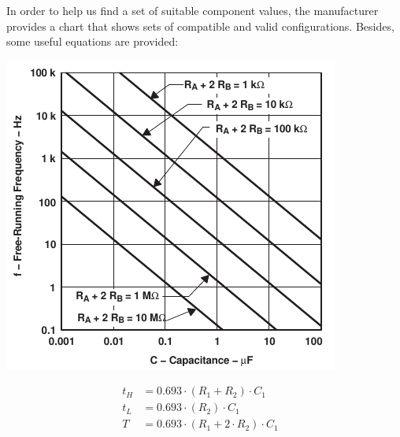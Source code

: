 \documentclass[a4paper, 11pt, oneside]{article}
\begin{document}
\vspace{0.25cm}

In order to help us find a set of suitable component values, the manufacturer provides a chart that shows sets of compatible and valid configurations. Besides, some useful equations are provided:

\vspace{0.6cm}

\begin{minipage}{\textwidth}
    \begin{minipage}[c]{0.49\textwidth}
        \centering
        \includegraphics[scale=1]{Graphics/Practice 2/GRAPHICS/555/GRAPHS/DATASHEETS/ASTABLE_FREQ.pdf}
        \label{fig:ASTABLE_FREQ}
    \end{minipage}
    \hfill
    \begin{minipage}[c]{0.49\textwidth}
        \centering
            \begin{align*}
                t_H &= 0.693 \cdot (R_1 + R_2) \cdot C_1& \\
                t_L &= 0.693 \cdot (R_2) \cdot C_1& \\
                T &= 0.693 \cdot (R_1 + 2\cdot R_2) \cdot C_1& \\
            \end{align*}
            
            \vspace{1.5cm}
    \end{minipage}
\end{minipage}
\end{document}
